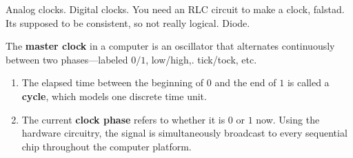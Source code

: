   Analog clocks. Digital clocks. 
  You need an RLC circuit to make a clock, falstad. 
  Its supposed to be consistent, so not really logical. Diode.

  \begin{definition}[Clock] 
    The \textbf{master clock} in a computer is an oscillator that alternates continuously between two phases---labeled $0/1$, low/high,. tick/tock, etc. 
    \begin{enumerate}
      \item The elapsed time between the beginning of $0$ and the end of $1$ is called a \textbf{cycle}, which models one discrete time unit. 
      \item The current \textbf{clock phase} refers to whether it is $0$ or $1$ now. Using the hardware circuitry, the signal is simultaneously broadcast to every sequential chip throughout the computer platform. 
    \end{enumerate}
  \end{definition}


